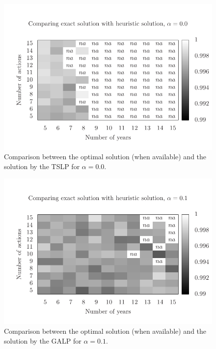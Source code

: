 \begin{figure}
\centering
\includegraphics[scale=0.5, trim=0.75cm 0cm 0 2cm, clip=true]{imgs/comp_very_hard_ts.pdf}
\caption{Comparison between the optimal solution (when available) 
and the solution by the TSLP for $\alpha=0.0$.}
\label{fig:mh2_1}
\end{figure} 

\begin{figure}
\centering
\includegraphics[scale=0.5, trim=0.75cm 0cm 0 2cm, clip=true]{imgs/comp_hard.pdf}
\caption{Comparison between the optimal solution (when available) 
and the solution by the GALP for $\alpha=0.1$.}
\label{fig:mh1_2}
\end{figure}

